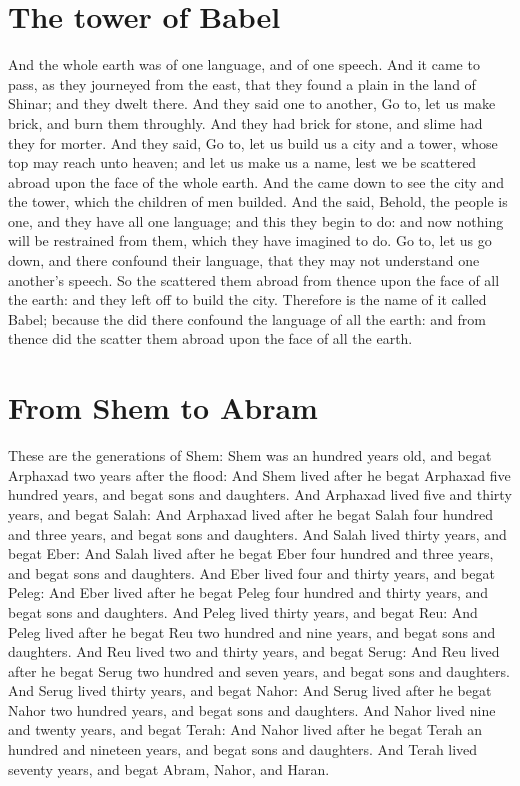\section*{The tower of Babel}
\begin{biblechapter} %
\verse And the whole earth was of one language, and of one speech.
\verse And it came to pass, as they journeyed from the east, that they found a plain in the land of Shinar; and they dwelt there.
\verse And they said one to another, Go to, let us make brick, and burn them throughly. And they had brick for stone, and slime had they for morter.
\verse And they said, Go to, let us build us a city and a tower, whose top may reach unto heaven; and let us make us a name, lest we be scattered abroad upon the face of the whole earth.
\verse And the \LORD came down to see the city and the tower, which the children of men builded.
\verse And the \LORD said, Behold, the people is one, and they have all one language; and this they begin to do: and now nothing will be restrained from them, which they have imagined to do.
\verse Go to, let us go down, and there confound their language, that they may not understand one another's speech.
\verse So the \LORD scattered them abroad from thence upon the face of all the earth: and they left off to build the city.
\verse Therefore is the name of it called Babel; because the \LORD did there confound the language of all the earth: and from thence did the \LORD scatter them abroad upon the face of all the earth.
\section*{From Shem to Abram}
\verse These are the generations of Shem: Shem was an hundred years old, and begat Arphaxad two years after the flood:
\verse And Shem lived after he begat Arphaxad five hundred years, and begat sons and daughters.
\verse And Arphaxad lived five and thirty years, and begat Salah:
\verse And Arphaxad lived after he begat Salah four hundred and three years, and begat sons and daughters.
\verse And Salah lived thirty years, and begat Eber:
\verse And Salah lived after he begat Eber four hundred and three years, and begat sons and daughters.
\verse And Eber lived four and thirty years, and begat Peleg:
\verse And Eber lived after he begat Peleg four hundred and thirty years, and begat sons and daughters.
\verse And Peleg lived thirty years, and begat Reu:
\verse And Peleg lived after he begat Reu two hundred and nine years, and begat sons and daughters.
\verse And Reu lived two and thirty years, and begat Serug:
\verse And Reu lived after he begat Serug two hundred and seven years, and begat sons and daughters.
\verse And Serug lived thirty years, and begat Nahor:
\verse And Serug lived after he begat Nahor two hundred years, and begat sons and daughters.
\verse And Nahor lived nine and twenty years, and begat Terah:
\verse And Nahor lived after he begat Terah an hundred and nineteen years, and begat sons and daughters.
\verse And Terah lived seventy years, and begat Abram, Nahor, and Haran.

\end{biblechapter}
